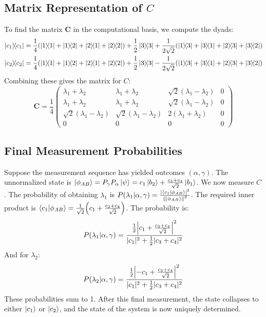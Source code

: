 \documentclass[11pt,a4paper]{article}
\begin{document}
\subsection{Matrix Representation of \texorpdfstring{$C$}{C}}
To find the matrix $\mathbf{C}$ in the computational basis, we compute the dyads:
\begin{align*}
\dyad{c_1}{c_1} &= \frac{1}{4}\qty(\dyad{1}{1}+\dyad{1}{2}+\dyad{2}{1}+\dyad{2}{2}) + \frac{1}{2}\dyad{3}{3} + \frac{1}{2\sqrt{2}}\qty(\dyad{1}{3}+\dyad{3}{1}+\dyad{2}{3}+\dyad{3}{2}) \\
\dyad{c_2}{c_2} &= \frac{1}{4}\qty(\dyad{1}{1}+\dyad{1}{2}+\dyad{2}{1}+\dyad{2}{2}) + \frac{1}{2}\dyad{3}{3} - \frac{1}{2\sqrt{2}}\qty(\dyad{1}{3}+\dyad{3}{1}+\dyad{2}{3}+\dyad{3}{2})
\end{align*}
Combining these gives the matrix for $C$:
$$
\mathbf{C} = \frac{1}{4}
\begin{pmatrix}
\lambda_1+\lambda_2 & \lambda_1+\lambda_2 & \sqrt{2}(\lambda_1-\lambda_2) & 0 \\
\lambda_1+\lambda_2 & \lambda_1+\lambda_2 & \sqrt{2}(\lambda_1-\lambda_2) & 0 \\
\sqrt{2}(\lambda_1-\lambda_2) & \sqrt{2}(\lambda_1-\lambda_2) & 2(\lambda_1+\lambda_2) & 0 \\
0 & 0 & 0 & 0
\end{pmatrix}
$$

\subsection{Final Measurement Probabilities}
Suppose the measurement sequence has yielded outcomes $(\alpha, \gamma)$. The unnormalized state is $\ket{\phi_{AB}} = P_\gamma P_\alpha \ket{\psi} = c_1\ket{b_2} + \frac{c_3+c_4}{\sqrt{2}}\ket{b_1}$.
We now measure $C$. The probability of obtaining $\lambda_1$ is $P(\lambda_1|\alpha, \gamma) = \frac{|\braket{c_1}{\phi_{AB}}|^2}{\norm{\ket{\phi_{AB}}}^2}$.
The required inner product is $\braket{c_1}{\phi_{AB}} = \frac{1}{\sqrt{2}}\qty(c_1 + \frac{c_3+c_4}{\sqrt{2}})$.
The probability is:
$$
P(\lambda_1|\alpha, \gamma) = \frac{\frac{1}{2}\abs{c_1 + \frac{c_3+c_4}{\sqrt{2}}}^2}{|c_1|^2 + \frac{1}{2}|c_3+c_4|^2}
$$
And for $\lambda_2$:
$$
P(\lambda_2|\alpha, \gamma) = \frac{\frac{1}{2}\abs{-c_1 + \frac{c_3+c_4}{\sqrt{2}}}^2}{|c_1|^2 + \frac{1}{2}|c_3+c_4|^2}
$$
These probabilities sum to 1. After this final measurement, the state collapses to either $\ket{c_1}$ or $\ket{c_2}$, and the state of the system is now uniquely determined.
\end{document}
